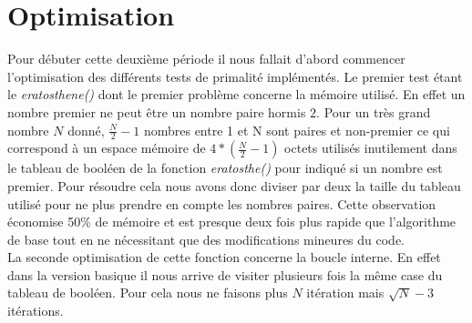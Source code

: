 		
	\section{Optimisation}
	Pour débuter cette deuxième période il nous fallait d'abord commencer l'optimisation des différents tests de primalité implémentés. Le premier test étant le \textit{eratosthene()} dont le premier problème concerne la mémoire utilisé. En effet un nombre premier ne peut être un nombre paire hormis $2$. Pour un très grand nombre $N$ donné, $\frac{N}{2}-1$ nombres entre 1 et N sont paires et non-premier ce qui correspond à un espace mémoire de $4*(\frac{N}{2}-1)$ octets utilisés inutilement dans le tableau de booléen de la fonction \textit{eratosthe()} pour indiqué si un nombre est premier. Pour résoudre cela nous avons donc diviser par deux la taille du tableau utilisé pour ne plus prendre en compte les nombres paires. Cette observation économise 50\% de mémoire et est presque deux fois plus rapide que l'algorithme de base tout en ne nécessitant que des modifications mineures du code.\\
La seconde optimisation de cette fonction concerne la boucle interne. En effet dans la version basique il nous arrive de visiter plusieurs fois la même case du tableau de booléen. Pour cela nous ne faisons plus $N$ itération mais $\sqrt{N}-3$ itérations.

